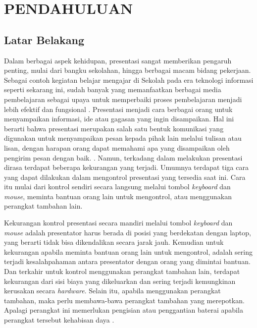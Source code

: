 \chapter{PENDAHULUAN}
\label{chap:pendahuluan}


\section{Latar Belakang}
\label{sec:latarbelakang}

Dalam berbagai aspek kehidupan, presentasi sangat memberikan pengaruh penting, mulai dari bangku sekolahan, hingga berbagai macam bidang pekerjaan. Sebagai contoh kegiatan belajar mengajar di Sekolah pada era teknologi informasi seperti sekarang ini, sudah banyak yang memanfaatkan berbagai media pembelajaran sebagai upaya untuk memperbaiki proses pembelajaran menjadi lebih efektif dan fungsional \parencite{Rasmila2022}. Presentasi menjadi cara berbagai orang untuk menyampaikan informasi, ide atau gagasan yang ingin disampaikan. Hal ini berarti bahwa presentasi merupakan salah satu bentuk komunikasi yang digunakan untuk menyampaikan pesan kepada pihak lain melalui tulisan atau lisan, dengan harapan orang dapat memahami apa yang disampaikan oleh pengirim pesan dengan baik. \parencite{Hilmia2016}. Namun, terkadang dalam melakukan presentasi dirasa terdapat beberapa kekurangan yang terjadi. Umumnya terdapat tiga cara yang dapat dilakukan dalam mengontrol presentasi yang tersedia saat ini. Cara itu mulai dari kontrol sendiri secara langsung melalui tombol \emph{keyboard} dan \emph{mouse}, meminta bantuan orang lain untuk mengontrol, atau menggunakan perangkat tambahan lain.\parencite{MuhammadIdress2021} 

Kekurangan kontrol presentasi secara mandiri melalui tombol \emph{keyboard} dan \emph{mouse} adalah presentator harus berada di posisi yang berdekatan dengan laptop, yang berarti tidak bisa dikendalikan secara jarak jauh. Kemudian untuk kekurangan apabila meminta bantuan orang lain untuk mengontrol, adalah sering terjadi kesalahpahaman antara presentator dengan orang yang dimintai bantuan. Dan terkahir untuk kontrol menggunakan perangkat tambahan lain, terdapat kekurangan dari sisi biaya yang dikeluarkan dan sering terjadi kemungkinan kerusakan secara \emph{hardware}. Selain itu, apabila menggunakan perangkat tambahan, maka perlu membawa-bawa perangkat tambahan yang merepotkan. Apalagi perangkat ini memerlukan pengisian atau penggantian baterai apabila perangkat tersebut kehabisan daya \parencite{Rahmad2022}.

